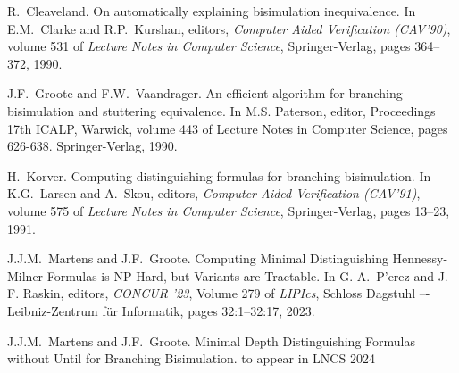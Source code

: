 \documentclass{article}
\begin{document}
\begin{thebibliography}{10}
R.~Cleaveland. On automatically explaining bisimulation inequivalence.
In E.M.~Clarke and R.P.~Kurshan, editors, {\it Computer Aided Verification (CAV'90)}, volume
531 of {\it Lecture Notes in Computer Science}, Springer-Verlag, pages 364--372, 1990.

J.F.~Groote and F.W.~Vaandrager. An efficient algorithm for branching bisimulation and stuttering equivalence. 
In M.S. Paterson, editor, Proceedings 17th ICALP, Warwick, volume 443 of Lecture Notes in Computer Science, 
pages 626-638. Springer-Verlag, 1990.

H.~Korver. Computing distinguishing formulas for branching bisimulation.
In K.G.~Larsen and A.~Skou, editors, {\it Computer Aided Verification (CAV'91)}, volume 575 of
{\it Lecture Notes in Computer Science}, Springer-Verlag, pages 13--23, 1991.

J.J.M.~Martens and J.F.~Groote. Computing Minimal Distinguishing Hennessy-Milner Formulas is NP-Hard, but Variants are Tractable.
In G.-A.~P'erez and J.-F. Raskin, editors, {\it CONCUR '23}, Volume 279 of
{\it LIPIcs}, Schloss Dagstuhl –- Leibniz-Zentrum für Informatik, pages 32:1--32:17, 2023.

J.J.M.~Martens and J.F.~Groote. Minimal Depth Distinguishing Formulas without Until for Branching Bisimulation. 
to appear in LNCS 2024

\end{thebibliography}
\end{document}

